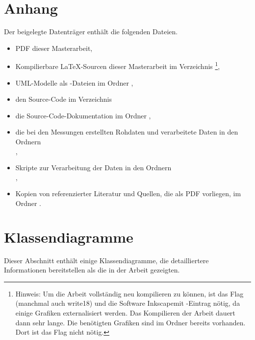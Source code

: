 \appendix
\clearpage
\renewcommand{\sectionmark}[1]{\markboth{\Ifnumbered{section}{Anhang \thesection}{}}{#1}}
\setcounter{page}{1}

\section*{Anhang}
{}

Der beigelegte Datenträger enthält die folgenden Dateien.

\begin{itemize}
	\item PDF dieser Masterarbeit,
	\item Kompilierbare \LaTeX-Sourcen dieser Masterarbeit im Verzeichnis \footnote{Hinweis: Um die Arbeit vollständig neu kompilieren zu können, ist das Flag  (manchmal auch write18) und die Software Inkscape\footnotemark mit -Eintrag nötig, da einige Grafiken externalisiert werden. Das Kompilieren der Arbeit dauert dann sehr lange. Die benötigten Grafiken sind im Ordner  bereits vorhanden. Dort ist das Flag nicht nötig.},
	\item UML-Modelle als -Dateien im Ordner ,
	\item den Source-Code im Verzeichnis 
	\item die Source-Code-Dokumentation im Ordner ,
	\item die bei den Messungen erstellten Rohdaten und verarbeitete Daten in den Ordnern\\ ,
	\item Skripte zur Verarbeitung der Daten in den Ordnern\\ ,
	\item Kopien von referenzierter Literatur und Quellen, die als PDF vorliegen, im Ordner .
\end{itemize}


\clearpage
\section{Klassendiagramme}
Dieser Abschnitt enthält einige Klassendiagramme, die detailliertere Informationen bereitstellen als die in der Arbeit gezeigten.
